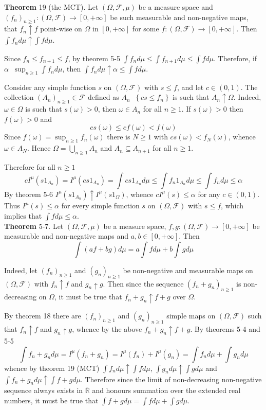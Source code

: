 \documentclass[a4paper]{article}
\newcommand{\obj}[1]{\left\{ #1 \right \}}
\newcommand{\clo}[1]{\left [ #1 \right ]}
\newcommand{\brac}[1]{\left ( #1 \right )}
\newcommand{\Rbar}{{\bar{\mathbb{R}}}}
\newcommand{\Zinf}{\clo{ 0, +\infty }}
\newcommand{\Fcal}{\mathcal{F}}
\newcommand{\defn}{\mathop{\overset{\Delta}{=}}\nolimits}
\begin{document}
\label{thm:MCT} \noindent \textbf{Theorem} 19 (the MCT).
Let $\brac{\Omega, \Fcal, \mu}$ be a measure space and $\brac{f_n}_{n\geq 1}:\brac{\Omega, \Fcal}\to\Zinf$ be such measurable and non-negative maps, that $f_n\uparrow f$ point-wise on $\Omega$ in $\Zinf$ for some $f:\brac{\Omega, \Fcal}\to\Zinf$. Then $\int f_n d\mu \uparrow \int f d\mu$.

Since $f_n\leq f_{n+1}\leq f$, by theorem 5-5 $\int f_n d\mu \leq \int f_{n+1} d\mu \leq \int f d\mu$. Therefore, if $\alpha\defn\sup_{n\geq 1} \int f_n d\mu$, then $\int f_n d\mu \uparrow \alpha \leq \int f d\mu$.

Consider any simple function $s$ on $\brac{\Omega, \Fcal}$ with $s\leq f$, and let $c\in \brac{0,1}$. The collection $\brac{A_n}_{n\geq1}\in \Fcal$ defined as $A_n\defn\obj{c s\leq f_n}$ is such that $A_n\uparrow\Omega$. Indeed, $\omega\in \Omega$ is such that $s\brac{\omega}>0$, then $\omega\in A_n$ for all $n\geq1$. If $s\brac{\omega}>0$ then $f\brac{\omega}>0$ and \[c s\brac{\omega} \leq c f \brac{\omega} < f\brac{\omega}\] Since $f\brac{\omega}=\sup_{n\geq1} f_n\brac{\omega}$ there is $N\geq 1$ with $c s\brac{\omega} < f_N\brac{\omega}$, whence $\omega\in A_N$. Hence $\Omega=\bigcup_{n\geq1} A_n$ and $A_n\subseteq A_{n+1}$ for all $n\geq1$.

Therefore for all $n\geq 1$ \[c I^\mu\brac{s 1_{A_n}} = I^\mu\brac{c s 1_{A_n}} = \int c s 1_{A_n} d\mu\leq \int f_n 1_{A_n} d\mu\leq \int f_n d\mu\leq \alpha\] By theorem 5-6 $I^\mu\brac{s 1_{A_n}}\uparrow I^\mu\brac{s 1_\Omega}$, whence $c I^\mu\brac{s} \leq \alpha$ for any $c\in \brac{0,1}$. Thus $I^\mu\brac{s} \leq \alpha$ for every simple function $s$ on $\brac{\Omega, \Fcal}$ with $s\leq f$, which implies that $\int f d\mu \leq \alpha$.\\

\label{thm:usu_int_linear} \noindent \textbf{Theorem} 5-7.
Let $\brac{\Omega, \Fcal, \mu}$ be a measure space, $f,g:\brac{\Omega, \Fcal}\to\Zinf$ be measurable and non-negative maps and $a,b\in\Zinf$. Then \[\int \brac{a f + b g} d\mu = a\int f d\mu + b\int g d\mu\]

Indeed, let $\brac{f_n}_{n\geq1}$ and $\brac{g_n}_{n\geq1}$ be non-negative and measurable maps on $\brac{\Omega, \Fcal}$ with $f_n\uparrow f$ and $g_n\uparrow g$. Then since the sequence $\brac{f_n+g_n}_{n\geq1}$ is non-decreasing on $\Omega$, it must be true that $f_n+g_n\uparrow f+g$ over $\Omega$.

By theorem 18 there are $\brac{f_n}_{n\geq1}$ and $\brac{g_n}_{n\geq1}$ simple maps on $\brac{\Omega, \Fcal}$ such that $f_n\uparrow f$ and $g_n\uparrow g$, whence by the above $f_n+g_n\uparrow f+g$. By theorems 5-4 and 5-5 \[\int f_n + g_n d\mu = I^\mu\brac{f_n+g_n}=I^\mu\brac{f_n}+I^\mu\brac{g_n} = \int f_n d\mu + \int g_n d\mu \] whence by theorem 19 (MCT) $\int f_n d\mu \uparrow \int f d\mu$, $\int g_n d\mu \uparrow \int g d\mu$ and $\int f_n+g_n d\mu \uparrow \int f+g d\mu$. Therefore since the limit of non-decreasing non-negative sequence always exists in $\Rbar$ and honours summation over the extended real numbers, it must be true that $\int f+g d\mu = \int f d\mu+\int g d\mu$.
\end{document}
